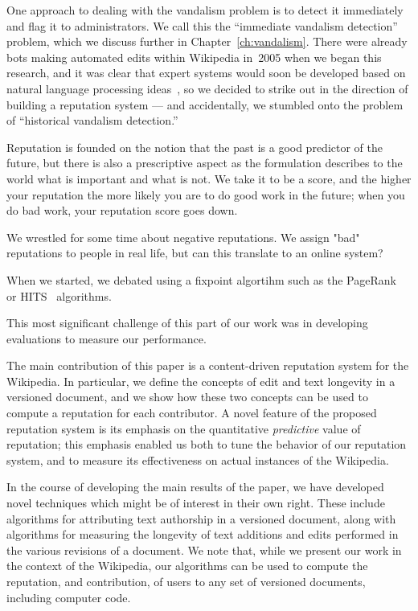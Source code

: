 One approach to dealing with the vandalism problem is to detect
it immediately and flag it to administrators.
We call this the ``immediate vandalism detection'' problem,
which we discuss further in Chapter~\ref{ch:vandalism}.
There were already bots making automated edits within Wikipedia
in~2005 when we began this research, and it was clear that
expert systems would soon be developed based on natural language processing
ideas~\cite{wiki:AntiVandalBot,wiki:MartinBot,wiki:ClueBot,Carter2007},
so we decided to strike out in the direction of building a reputation system
--- and accidentally, we stumbled onto the problem of
``historical vandalism detection.''


Reputation is founded on the notion that the past is a good
predictor of the future, but there is also a prescriptive aspect
as the formulation describes to the world what is important and
what is not.
We take it to be a score, and the higher your reputation the more
likely you are to do good work in the future; when you do bad
work, your reputation score goes down.

We wrestled for some time about negative reputations. We assign "bad"
reputations to people in real life, but can this translate to an online
system?  

When we started, we debated using a fixpoint algortihm
such as the PageRank~\cite{Page1999} or HITS~\cite{Kleinberg1999}
algorithms.

This most significant challenge of this part of our work
was in developing evaluations to measure our performance.

The main contribution of this paper is a content-driven reputation
system for the Wikipedia. 
In particular, we define the concepts of edit and text longevity in a
versioned document, and we show how these two concepts can be used to
compute a reputation for each contributor. 
A novel feature of the proposed reputation system is its emphasis on
the quantitative {\em predictive\/} value of reputation; this emphasis
enabled us both to tune the behavior of our reputation system, and to
measure its effectiveness on actual instances of the Wikipedia. 

In the course of developing the main results of the paper, we have
developed novel techniques which might be of interest in their own
right. 
These include algorithms for attributing text authorship in a
versioned document, along with algorithms for measuring the longevity
of text additions and edits performed in the various revisions of a
document. 
We note that, while we present our work in the context of the
Wikipedia, our algorithms can be used to compute the reputation, and
contribution, of users to any set of versioned documents, including
computer code. 



